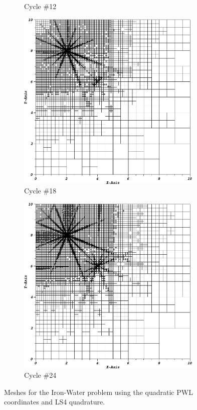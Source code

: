 \begin{figure}
\begin{subfigure}[b]{0.485\textwidth}
		\caption{Cycle \#12}
	\end{subfigure}
	\vfill
	\begin{subfigure}[b]{0.485\textwidth}
		\centering
		\includegraphics[width=0.975\textwidth]{figures/sec_DSA/IW_PWLD2_LS4_cyc18.png}
		\caption{Cycle \#18}
	\end{subfigure}
	\hfill
	\begin{subfigure}[b]{0.485\textwidth}
		\centering
		\includegraphics[width=0.975\textwidth]{figures/sec_DSA/IW_PWLD2_LS4_cyc24.png}
		\caption{Cycle \#24}
	\end{subfigure}
\caption{Meshes for the Iron-Water problem using the quadratic PWL coordinates and LS4 quadrature.}
\label{fig::IW_PWLD2_LS4_meshes}
\end{figure}

